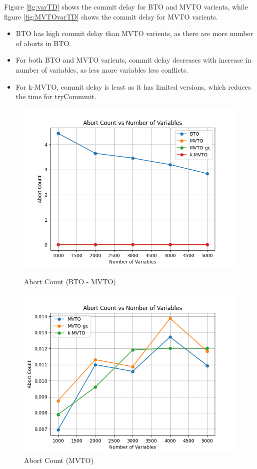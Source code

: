 \documentclass[12pt]{article}
\begin{document}
Figure \ref{fig:varTD} shows the commit delay for BTO and MVTO varients, while figure \ref{fig:MVTOvarTD} shows the commit delay for MVTO varients.
\begin{itemize}
    \item BTO has high commit delay than MVTO varients, as there are more number of aborts in BTO.
    \item For both BTO and MVTO varients, commit delay decreases with increase in number of variables, as less more variables less conflicts.
    \item For k-MVTO, commit delay is least as it has limited versions, which reduces the time for tryCommmit.
\end{itemize}
\begin{figure}[h]
    \centering
    \begin{minipage}[b]{0.45\textwidth}
        \includegraphics[width=\textwidth]{./images/VarAC.png}
        \caption{Abort Count (BTO - MVTO)}
        \label{fig:varAC}
    \end{minipage}
    \hfill
    \begin{minipage}[b]{0.45\textwidth}
        \includegraphics[width=\textwidth]{./images/MVTOvarAC.png}
        \caption{Abort Count (MVTO)}
        \label{fig:MVTOvarAC}
    \end{minipage}
\end{figure}
\end{document}
